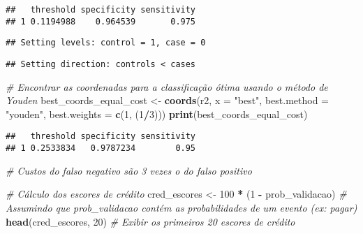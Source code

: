 \documentclass[
]{article}
\newenvironment{Shaded}{\begin{snugshade}}{\end{snugshade}}
\newcommand{\AttributeTok}[1]{\textcolor[rgb]{0.13,0.29,0.53}{#1}}
\newcommand{\CommentTok}[1]{\textcolor[rgb]{0.56,0.35,0.01}{\textit{#1}}}
\newcommand{\DecValTok}[1]{\textcolor[rgb]{0.00,0.00,0.81}{#1}}
\newcommand{\FunctionTok}[1]{\textcolor[rgb]{0.13,0.29,0.53}{\textbf{#1}}}
\newcommand{\NormalTok}[1]{#1}
\newcommand{\OtherTok}[1]{\textcolor[rgb]{0.56,0.35,0.01}{#1}}
\newcommand{\SpecialCharTok}[1]{\textcolor[rgb]{0.81,0.36,0.00}{\textbf{#1}}}
\newcommand{\StringTok}[1]{\textcolor[rgb]{0.31,0.60,0.02}{#1}}
\begin{document}
\begin{verbatim}
##   threshold specificity sensitivity
## 1 0.1194988    0.964539       0.975
\end{verbatim}

\begin{Shaded}
\end{Shaded}

\begin{verbatim}
## Setting levels: control = 1, case = 0
\end{verbatim}

\begin{verbatim}
## Setting direction: controls < cases
\end{verbatim}

\begin{Shaded}
\begin{Highlighting}[]
\CommentTok{\# Encontrar as coordenadas para a classificação ótima usando o método de Youden}
\NormalTok{best\_coords\_equal\_cost }\OtherTok{\textless{}{-}} \FunctionTok{coords}\NormalTok{(r2, }\AttributeTok{x =} \StringTok{"best"}\NormalTok{, }\AttributeTok{best.method =} \StringTok{"youden"}\NormalTok{, }\AttributeTok{best.weights =} \FunctionTok{c}\NormalTok{(}\DecValTok{1}\NormalTok{, (}\DecValTok{1}\SpecialCharTok{/}\DecValTok{3}\NormalTok{)))}
\FunctionTok{print}\NormalTok{(best\_coords\_equal\_cost)}
\end{Highlighting}
\end{Shaded}

\begin{verbatim}
##   threshold specificity sensitivity
## 1 0.2533834   0.9787234        0.95
\end{verbatim}

\begin{Shaded}
\begin{Highlighting}[]
\CommentTok{\# Custos do falso negativo são 3 vezes o do falso positivo}

\CommentTok{\# Cálculo dos escores de crédito}
\NormalTok{cred\_escores }\OtherTok{\textless{}{-}} \DecValTok{100} \SpecialCharTok{*}\NormalTok{ (}\DecValTok{1} \SpecialCharTok{{-}}\NormalTok{ prob\_validacao)  }\CommentTok{\# Assumindo que prob\_validacao contém as probabilidades de um evento (ex: pagar)}
\FunctionTok{head}\NormalTok{(cred\_escores, }\DecValTok{20}\NormalTok{)  }\CommentTok{\# Exibir os primeiros 20 escores de crédito}
\end{Highlighting}
\end{Shaded}
\end{document}
